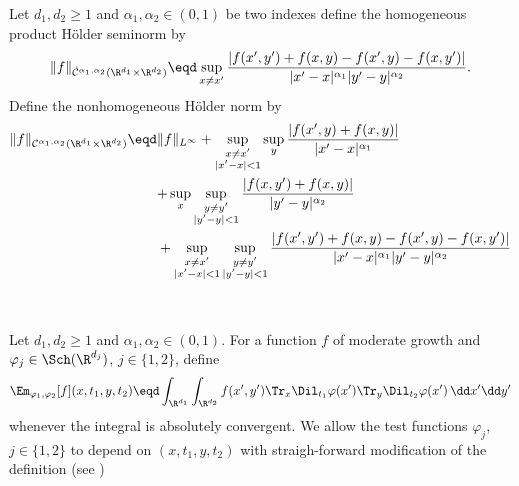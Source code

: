 \begin{definition}
  \label{def:product-holder-spaces}Let \(d_1, d_2 \geq 1\) and \(\alpha_1,
  \alpha_2 \in (0, 1)\) be two indexes define the homogeneous product
  H{\"o}lder seminorm by
  \begin{equation}
    \label{eq:holder-homogeneous-seminorm} \|f\|_{\dot{\mathcal{C}}^{\alpha_1,
    \alpha_2} (\R^{d_1} \times \R^{d_2})} \eqd \sup_{x \neq x'}  \frac{|f (x',
    y') + f (x, y) - f (x', y) - f (x, y') |}{|x' - x|^{\alpha_1} |y' -
    y|^{\alpha_2}} .
  \end{equation}
  Define the nonhomogeneous H{\"o}lder norm by
  \begin{equation}
    \label{eq:holder-nonhomogeneous-norm}
    \label{eq:holder-homogeneous-seminorm} \|f\|_{\mathcal{C}^{\alpha_1,
    \alpha_2} (\R^{d_1} \times \R^{d_2})} \eqd \begin{aligned}[t]
      &\|f\|_{L^{\infty}} + \sup_{\substack{
        x \neq x'\\
        |x' - x| < 1
      }} \sup_{\substack{
        y
      }}  \frac{|f (x', y) + f (x, y) |}{|x' - x|^{\alpha_1}}\\
      &{+ \sup_{\substack{
        x
      }}}  \sup_{\substack{
        y \neq y'\\
        |y' - y| < 1
      }} \frac{|f (x, y') + f (x, y) |}{|y' - y|^{\alpha_2}}\\
      &+ \sup_{\substack{
        x \neq x'\\
        |x' - x| < 1
      }} \sup_{\substack{
        y \neq y'\\
        |y' - y| < 1
      }} \frac{|f (x', y') + f (x, y) - f (x', y) - f (x, y')
      |}{|x' - x|^{\alpha_1} |y' - y|^{\alpha_2}}
    \end{aligned}
  \end{equation}
\end{definition}

\

\begin{definition}
  \label{def:product-wavelet-coefficients}Let \(d_1, d_2 \geq 1\) and \(\alpha_1,
  \alpha_2 \in (0, 1)\). For a function \(f\) of moderate growth and \(\varphi_j
  \in \Sch (\R^{d_j})\), \(j \in \{ 1, 2 \}\), define
  \begin{equation}
    \label{eq:wavelet-coefficient-fixed-test} \Em_{\varphi_1, \varphi_2} [f]
    (x, t_1, y, t_2) \eqd \int_{\R^{{d_1} }} \int_{\R^{{d_2} }} f (x', y')
    \Tr_x \Dil_{t_1} \varphi (x') \Tr_y \Dil_{t_2} \varphi (x')
    \hspace{0.17em} \dd x' \dd y'
  \end{equation}
  whenever the integral is absolutely convergent. We allow the test functions
  \(\varphi_j\), \(j \in \{ 1, 2 \}\) to depend on \((x, t_1, y, t_2)\) with
  straigh-forward modification of the definition (see
  )
\end{definition}